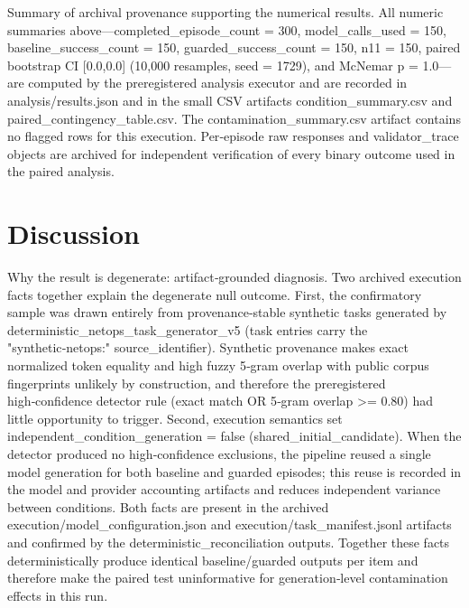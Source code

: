 \documentclass[conference]{IEEEtran}
\begin{document}
Summary of archival provenance supporting the numerical results. All numeric summaries above---completed\_episode\_count = 300, model\_calls\_used = 150, baseline\_success\_count = 150, guarded\_success\_count = 150, n11 = 150, paired bootstrap CI [0.0,0.0] (10,000 resamples, seed = 1729), and McNemar p = 1.0---are computed by the preregistered analysis executor and are recorded in analysis/results.json and in the small CSV artifacts condition\_summary.csv and paired\_contingency\_table.csv. The contamination\_summary.csv artifact contains no flagged rows for this execution. Per‑episode raw responses and validator\_trace objects are archived for independent verification of every binary outcome used in the paired analysis.

\section{Discussion}
Why the result is degenerate: artifact‑grounded diagnosis. Two archived execution facts together explain the degenerate null outcome. First, the confirmatory sample was drawn entirely from provenance‑stable synthetic tasks generated by deterministic\_netops\_task\_generator\_v5 (task entries carry the "synthetic‑netops:" source\_identifier). Synthetic provenance makes exact normalized token equality and high fuzzy 5‑gram overlap with public corpus fingerprints unlikely by construction, and therefore the preregistered high‑confidence detector rule (exact match OR 5‑gram overlap >= 0.80) had little opportunity to trigger. Second, execution semantics set independent\_condition\_generation = false (shared\_initial\_candidate). When the detector produced no high‑confidence exclusions, the pipeline reused a single model generation for both baseline and guarded episodes; this reuse is recorded in the model and provider accounting artifacts and reduces independent variance between conditions. Both facts are present in the archived execution/model\_configuration.json and execution/task\_manifest.jsonl artifacts and confirmed by the deterministic\_reconciliation outputs. Together these facts deterministically produce identical baseline/guarded outputs per item and therefore make the paired test uninformative for generation‑level contamination effects in this run.
\end{document}
